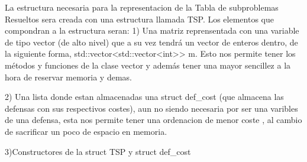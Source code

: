 La estructura necesaria para la representacion de la Tabla de subproblemas Resueltos
sera creada con una estructura llamada TSP.
Los elementos que compondran a la estructura seran:
    1) Una matriz reprensentada con una variable de tipo vector (de alto nivel)
    que a su vez tendrá un vector de enteros dentro, de la siguiente forma,
    std::vector<std::vector<int>> m.
    Esto nos permite tener los métodos y funciones de la clase vector y además
    tener una mayor sencillez a la hora de reservar memoria y demas.

    2) Una lista donde estan almacenadas una struct def_cost (que almacena las 
    defensas con sus respectivos costes), aun no siendo necesaria por ser una varibles 
    de una defensa, esta nos permite tener una ordenacion de menor coste , al cambio 
    de sacrificar un poco de espacio en memoria.

    3)Constructores de la struct TSP y struct def_cost
